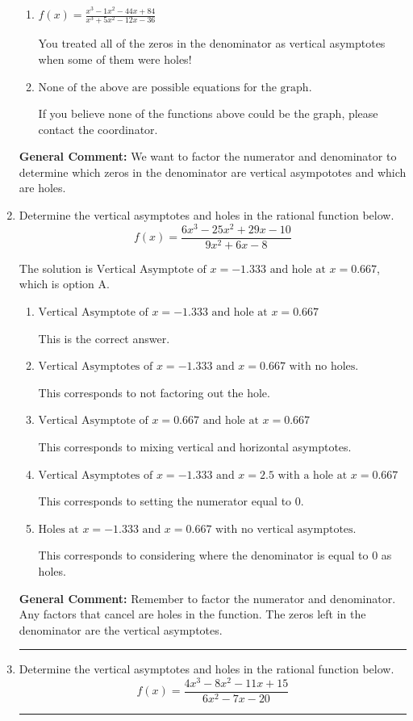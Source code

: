 \documentclass{extbook}[14pt]
\newcommand{\litem}[1]{\item #1

\rule{\textwidth}{0.4pt}}
\begin{document}
\begin{enumerate}
{\begin{enumerate}[label=\Alph*.]
This is the correct answer!
\item \( f(x)=\frac{x^{3} -1 x^{2} -44 x + 84}{x^{3} +5 x^{2} -12 x -36} \)

You treated all of the zeros in the denominator as vertical asymptotes when some of them were holes!
\item \( \text{None of the above are possible equations for the graph.} \)

If you believe none of the functions above could be the graph, please contact the coordinator.
\end{enumerate}

\textbf{General Comment:} We want to factor the numerator and denominator to determine which zeros in the denominator are vertical asympototes and which are holes.
}
\litem{
Determine the vertical asymptotes and holes in the rational function below.
\[ f(x) = \frac{6x^{3} -25 x^{2} +29 x -10}{9x^{2} +6 x -8} \]

The solution is \( \text{Vertical Asymptote of } x = -1.333 \text{ and hole at } x = 0.667 \), which is option A.\begin{enumerate}[label=\Alph*.]
\item \( \text{Vertical Asymptote of } x = -1.333 \text{ and hole at } x = 0.667 \)

This is the correct answer.
\item \( \text{Vertical Asymptotes of } x = -1.333 \text{ and } x = 0.667 \text{ with no holes.} \)

This corresponds to not factoring out the hole.
\item \( \text{Vertical Asymptote of } x = 0.667 \text{ and hole at } x = 0.667 \)

This corresponds to mixing vertical and horizontal asymptotes.
\item \( \text{Vertical Asymptotes of } x = -1.333 \text{ and } x = 2.5 \text{ with a hole at } x = 0.667 \)

This corresponds to setting the numerator equal to 0.
\item \( \text{Holes at } x = -1.333 \text{ and } x = 0.667 \text{ with no vertical asymptotes.} \)

This corresponds to considering where the denominator is equal to 0 as holes.
\end{enumerate}

\textbf{General Comment:} Remember to factor the numerator and denominator. Any factors that cancel are holes in the function. The zeros left in the denominator are the vertical asymptotes.
}
\litem{
Determine the vertical asymptotes and holes in the rational function below.
\[ f(x) = \frac{4x^{3} -8 x^{2} -11 x + 15}{6x^{2} -7 x -20} \]

}
\end{enumerate}
\end{document}
